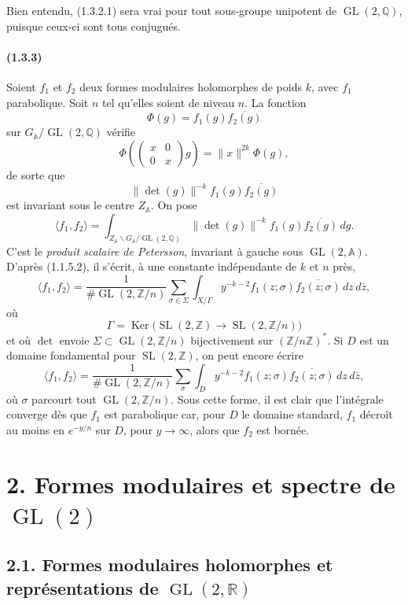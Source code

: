 \documentclass[10pt,a4paper]{article}
\providecommand{\GL}{\operatorname{GL}}
\providecommand{\SL}{\operatorname{SL}}
\providecommand{\Ker}{\operatorname{Ker}}
\providecommand{\R}{\mathbb R}
\providecommand{\Q}{\mathbb Q}
\providecommand{\Z}{\mathbb Z}
\begin{document}
\clearpage
{}
\hypertarget{authority-21}{}
Bien entendu, (1.3.2.1) sera vrai pour tout sous-groupe unipotent de \(\GL(2,\Q)\), puisque ceux-ci sont tous conjugués.

\paragraph{(1.3.3)} Soient \(f_1\) et \(f_2\) deux formes modulaires holomorphes de poids \(k\), avec \(f_1\) parabolique. Soit \(n\) tel qu'elles soient de niveau \(n\). La fonction
\[
\Phi(g)=f_1(g)\overline{f_2(g)}
\]
sur \(G_{\mathbb A}/\GL(2,\Q)\) vérifie
\[
\Phi\!\left(\begin{pmatrix}x&0\\0&x\end{pmatrix}g\right)=\|x\|^{2k}\Phi(g),
\]
de sorte que
\[
\|\det(g)\|^{-k}f_1(g)\overline{f_2(g)}
\]
est invariant sous le centre \(Z_{\mathbb A}\). On pose
\[
\langle f_1,f_2\rangle
=
\int_{Z_{\mathbb A}\backslash G_{\mathbb A}/\GL(2,\Q)}
\|\det(g)\|^{-k}f_1(g)\overline{f_2(g)}\,dg.
\]
C'est le \emph{produit scalaire de Petersson}, invariant à gauche sous \(\GL(2,\mathbb A)\). D'après (1.1.5.2), il s'écrit, à une constante indépendante de \(k\) et \(n\) près,
\[
\langle f_1,f_2\rangle
=
\frac1{\#\GL(2,\Z/n)}
\sum_{\sigma\in\Sigma}
\int_{X/\Gamma}
y^{-k-2}f_1(z;\sigma)\overline{f_2(z;\sigma)}\,dz\,d\bar z,
\]
où
\[
\Gamma=\Ker\bigl(\SL(2,\Z)\longrightarrow\SL(2,\Z/n)\bigr)
\]
et où \(\det\) envoie \(\Sigma\subset\GL(2,\Z/n)\) bijectivement sur \((\Z/n\Z)^*\). Si \(D\) est un domaine fondamental pour \(\SL(2,\Z)\), on peut encore écrire
\[
\langle f_1,f_2\rangle
=
\frac1{\#\GL(2,\Z/n)}
\sum_{\sigma}
\int_D
y^{-k-2}f_1(z;\sigma)\overline{f_2(z;\sigma)}\,dz\,d\bar z,
\]
où \(\sigma\) parcourt tout \(\GL(2,\Z/n)\). Sous cette forme, il est clair que l'intégrale converge dès que \(f_1\) est parabolique car, pour \(D\) le domaine standard, \(f_1\) décroît au moins en \(e^{-y/n}\) sur \(D\), pour \(y\to\infty\), alors que \(f_2\) est bornée.

\clearpage
{}
\hypertarget{authority-22}{}
\section*{2. Formes modulaires et spectre de \(\GL(2)\)}

\subsection*{2.1. Formes modulaires holomorphes et représentations de \(\GL(2,\R)\)}
\end{document}
